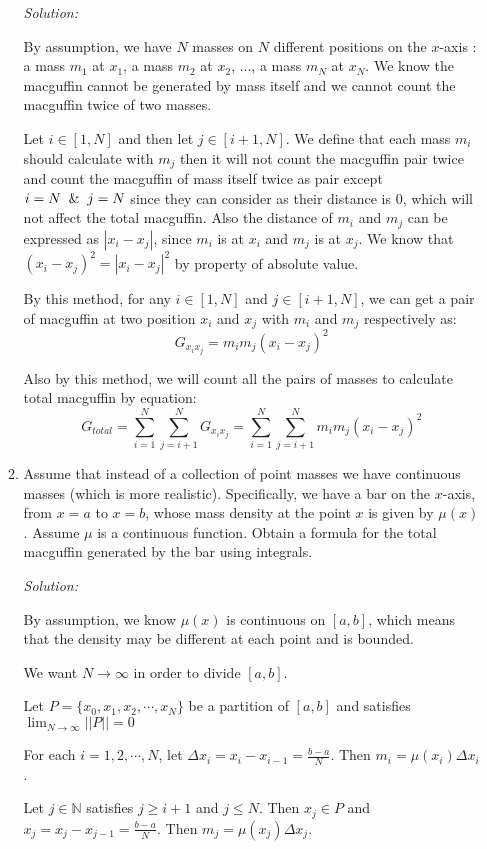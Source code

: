 \documentclass[12pt]{exam}
\newcommand{\N}{\mathbb{N}}
\begin{document}
\begin{enumerate}
\begin{enumerate}
	\emph{Solution:}
	
	By assumption, we have $N$ masses on $N$ different positions on the $x$-axis : a mass $m_1$ at $x_1$, a mass $m_2$ at $x_2$, ..., a mass $m_N$ at $x_N$. We know the macguffin cannot be generated by mass itself and we cannot count the macguffin twice of two masses.
	
	Let $i\in [1, N]$ and then let $j\in [i+1, N]$. We define that each mass $m_i$ should calculate with $m_j$ then it will not count the macguffin pair twice and count the macguffin of mass itself twice as pair except $i=N \And j=N$ since they can consider as their distance is $0$, which will not affect the total macguffin. Also the distance of $m_i$ and $m_j$ can be expressed as $|x_i-x_j|$, since $m_i$ is at $x_i$ and $m_j$ is at $x_j$. We know that $(x_i-x_j)^2=|x_i-x_j|^2$ by property of absolute value.
	
	By this method, for any $i\in [1, N]$ and $j\in [i+1, N]$, we can get a pair of macguffin at two position $x_i$ and $x_j$ with $m_i$ and $m_j$ respectively as:
	$$
	    G_{x_ix_j}=m_im_j(x_i-x_j)^2
	$$
	
	Also by this method, we will count all the pairs of masses to calculate total macguffin by equation:
	$$
	    G_{total}=\sum_{i=1}^{N}\sum_{j=i+1}^{N}G_{x_ix_j}=\sum_{i=1}^{N}\sum_{j=i+1}^{N}m_im_j(x_i-x_j)^2
	$$
	
	\newpage
	
	\item  Assume that instead of a collection of point masses we have continuous masses (which is more realistic).  Specifically, we have a bar on the $x$-axis, from $x=a$ to $x=b$, whose mass density at the point $x$ is given by $\mu(x)$.  Assume $\mu$ is a continuous function.  Obtain a formula for the total macguffin generated by the bar using integrals.
	
	\emph{Solution:}
	
	By assumption, we know $\mu(x)$ is continuous on $[a, b]$, which means that the density may be different at each point and is bounded.
	
	We want $N \to \infty$ in order to divide $[a,b]$.
	
	Let $P=\{x_0,x_1,x_2,\cdots,x_N\}$ be a partition of $[a,b]$ and satisfies $\lim_{N\to\infty}||P||=0$
	
	For each $i=1,2,\cdots,N$, let $\Delta x_i=x_i-x_{i-1}=\frac{b-a}{N}$. Then $m_i=\mu(x_i)\Delta x_i$.
	
	Let $j\in\N$ satisfies $j\geq i+1$ and $j\leq N$. Then $x_j\in P$ and $x_j=x_j-x_{j-1}=\frac{b-a}{N}$. Then $m_j=\mu(x_j)\Delta x_j$.
	

\end{enumerate}
\end{enumerate}
\end{document}

